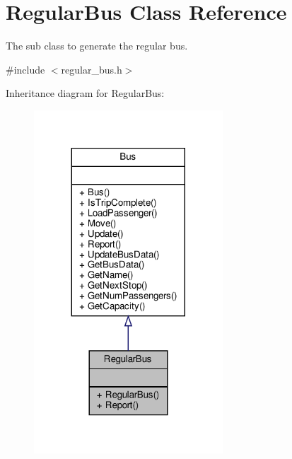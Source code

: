 \hypertarget{classRegularBus}{}\section{Regular\+Bus Class Reference}
\label{classRegularBus}


The sub class to generate the regular bus.  




{\ttfamily \#include $<$regular\+\_\+bus.\+h$>$}



Inheritance diagram for Regular\+Bus\+:\nopagebreak
\begin{figure}[H]
\begin{center}
\leavevmode
\includegraphics[width=200pt]{classRegularBus__inherit__graph}
\end{center}
\end{figure}


